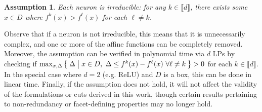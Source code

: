\documentclass[smallextended]{svjour3}
\newcommand{\bbR}{\mathbb{R}}
\newcommand{\gr}{\operatorname{gr}}
\newcommand\defeq{\mathrel{\overset{\makebox[0pt]{\mbox{\normalfont\tiny\sffamily def}}}{=}}}
\newcommand{\NL}{\texttt{NL}}
\newtheorem{assumption}{Assumption}
\begin{document}
\begin{assumption} \label{ass:amphibious}
    Each neuron is \emph{irreducible}: for any $k \in \llbracket d \rrbracket$, there exists some $x \in D$ where $f^k(x) > f^\ell(x)$ for each $\ell \neq k$.
\end{assumption}

Observe that if a neuron is not irreducible, this means that it is unnecessarily complex, and one or more of the affine functions can be completely removed. Moreover, the assumption can be verified in polynomial time via $d$ LPs by checking if $\max_{x,\Delta} \Set{\Delta | x \in D,\ \Delta \leq f^k(x) - f^\ell(x)\ \forall \ell \neq k} > 0$ for each $k \in \llbracket d \rrbracket$. In the special case where $d = 2$ (e.g. ReLU) and $D$ is a box, this can be done in linear time.  Finally, if the assumption does not hold, it will not affect the validity of the formulations or cuts derived in this work, though certain results pertaining to non-redundancy or facet-defining properties may no longer hold.

\end{document}
